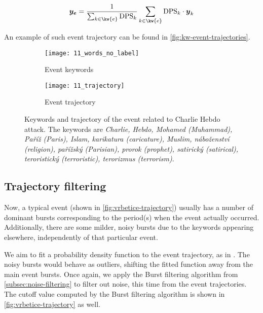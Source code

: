 \begin{equation}
	\vect{\traj_{e}} = \frac{1}{\sum_{k \in \kw{e}}{\text{DPS}_{k}}} \sum_{k \in \kw{e}}{\text{DPS}_{k} \cdot \vect{\traj}_{k}}
\end{equation}

An example of such event trajectory can be found in \autoref{fig:kw-event-trajectories}.


\begin{figure}
\centering
\begin{subfigure}{.5\textwidth}
  \centering
  \texttt{[image: 11\_words\_no\_label]}  %
  \caption{Event keywords}
  \label{fig:hebdo-words}
\end{subfigure}%
\begin{subfigure}{.5\textwidth}
  \centering
  \texttt{[image: 11\_trajectory]}  %
  \caption{Event trajectory}
  \label{fig:hebdo-trajectory}
\end{subfigure}
\caption{Keywords and trajectory of the event related to Charlie Hebdo attack. The keywords are \textit{Charlie, Hebdo, Mohamed (Muhammad), Paříž (Paris), Islam, karikatura (caricature), Muslim, náboženství (religion), pařížský (Parisian), prorok (prophet), satirický (satirical), teroristický (terroristic), terorizmus (terrorism)}.}
\label{fig:kw-event-trajectories}
\end{figure}


\subsection{Trajectory filtering} \label{subsec:trajectory-filtering}

Now, a typical event (shown in \autoref{fig:vrbetice-trajectory}) usually has a number of dominant bursts corresponding to the period(s) when the event actually occurred. Additionally, there are some milder, noisy bursts due to the keywords appearing elsewhere, independently of that particular event.

We aim to fit a probability density function to the event trajectory, as in \cite{event-detection}. The noisy bursts would behave as outliers, shifting the fitted function away from the main event bursts. Once again, we apply the Burst filtering algorithm from \autoref{subsec:noise-filtering} to filter out noise, this time from the event trajectories. The cutoff value computed by the Burst filtering algorithm is shown in \autoref{fig:vrbetice-trajectory} as well.


